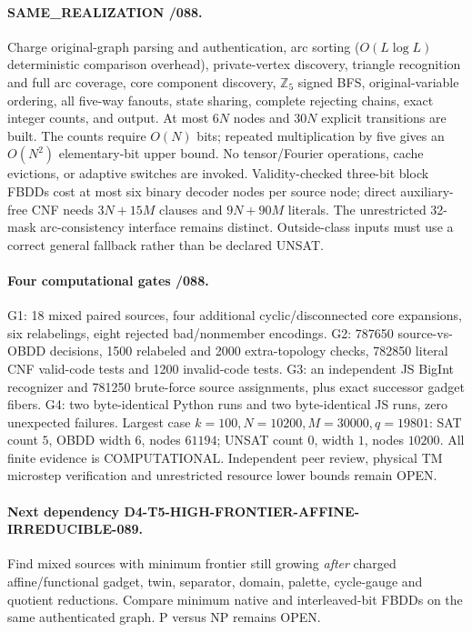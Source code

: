 \documentclass[11pt]{article}
\begin{document}
\paragraph{SAME\_REALIZATION /088.}
Charge original-graph parsing and authentication,
arc sorting ($O(L\log L)$ deterministic comparison
overhead), private-vertex discovery, triangle
recognition and full arc coverage, core component
discovery, $\mathbb Z_5$ signed BFS, original-variable
ordering, all five-way fanouts, state sharing,
complete rejecting chains, exact integer counts,
and output. At most $6N$ nodes and $30N$
explicit transitions are built. The counts
require $O(N)$ bits; repeated multiplication by
five gives an $O(N^2)$ elementary-bit upper bound.
No tensor/Fourier operations, cache evictions,
or adaptive switches are invoked.
Validity-checked three-bit block FBDDs cost at most
six binary decoder nodes per source node; direct
auxiliary-free CNF needs $3N+15M$ clauses and
$9N+90M$ literals. The unrestricted 32-mask
arc-consistency interface remains distinct.
Outside-class inputs must use a correct general
fallback rather than be declared UNSAT.
\paragraph{Four computational gates /088.}
G1: 18 mixed paired sources, four additional
cyclic/disconnected core expansions, six relabelings,
eight rejected bad/nonmember encodings.
G2: 787650 source-vs-OBDD decisions, 1500 relabeled
and 2000 extra-topology checks, 782850 literal
CNF valid-code tests and 1200 invalid-code tests.
G3: an independent JS BigInt recognizer and
781250 brute-force source assignments, plus exact
successor gadget fibers.
G4: two byte-identical Python runs and two
byte-identical JS runs, zero unexpected failures.
Largest case $k=100,N=10200,M=30000,q=19801$:
SAT count $5$, OBDD width $6$, nodes $61194$;
UNSAT count $0$, width $1$, nodes $10200$.
All finite evidence is COMPUTATIONAL.
Independent peer review, physical TM microstep
verification and unrestricted resource lower
bounds remain OPEN.
\paragraph{Next dependency D4-T5-HIGH-FRONTIER-AFFINE-IRREDUCIBLE-089.}
Find mixed sources with minimum frontier still
growing \emph{after} charged affine/functional
gadget, twin, separator, domain, palette,
cycle-gauge and quotient reductions. Compare
minimum native and interleaved-bit FBDDs on
the same authenticated graph. P versus NP remains OPEN.
\end{document}
